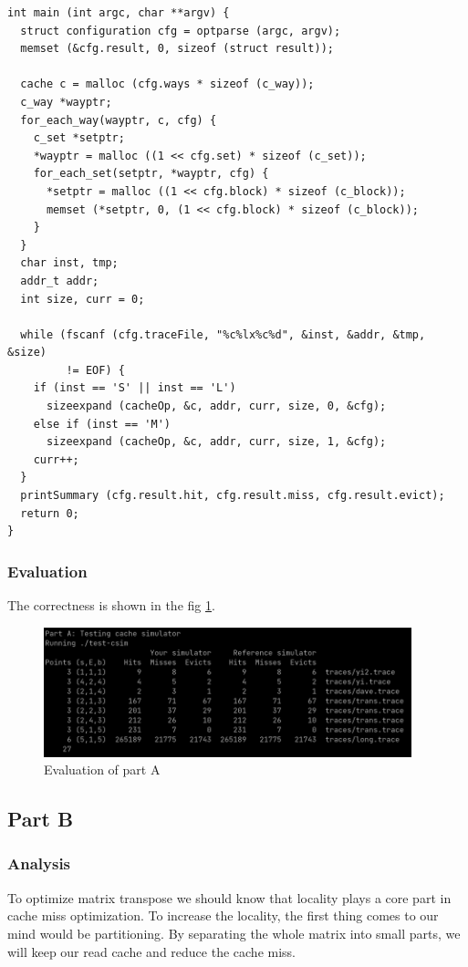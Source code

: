 \documentclass{article}
\begin{document}
\begin{lstlisting}
int main (int argc, char **argv) {
  struct configuration cfg = optparse (argc, argv);
  memset (&cfg.result, 0, sizeof (struct result));

  cache c = malloc (cfg.ways * sizeof (c_way));
  c_way *wayptr;
  for_each_way(wayptr, c, cfg) {
    c_set *setptr;
    *wayptr = malloc ((1 << cfg.set) * sizeof (c_set));
    for_each_set(setptr, *wayptr, cfg) {
      *setptr = malloc ((1 << cfg.block) * sizeof (c_block));
      memset (*setptr, 0, (1 << cfg.block) * sizeof (c_block));
    }
  }
  char inst, tmp;
  addr_t addr;
  int size, curr = 0;

  while (fscanf (cfg.traceFile, "%c%lx%c%d", &inst, &addr, &tmp, &size)
         != EOF) {
    if (inst == 'S' || inst == 'L')
      sizeexpand (cacheOp, &c, addr, curr, size, 0, &cfg);
    else if (inst == 'M')
      sizeexpand (cacheOp, &c, addr, curr, size, 1, &cfg);
    curr++;
  }
  printSummary (cfg.result.hit, cfg.result.miss, cfg.result.evict);
  return 0;
}
\end{lstlisting}


\subsubsection{Evaluation}

The correctness is shown in the fig \ref{fig:evalA}.

\begin{figure}
    \centering
    \includegraphics[width=0.95\textwidth]{1.png}
    \caption{Evaluation of part A}
    \label{fig:evalA}
\end{figure}

\subsection{Part B}

\subsubsection{Analysis}

To optimize matrix transpose we should know that locality plays a core part in cache miss optimization. To increase the locality, the first thing comes to our mind would be partitioning. By separating the whole matrix into small parts, we will keep our read cache and reduce the cache miss.
\end{document}
